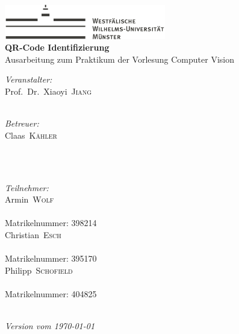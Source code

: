 
\begin{titlepage}
\begin{center}
\includegraphics[height=1.5cm, keepaspectratio]{images/Logo_WWU_Muenster.pdf} \\[1.0cm]
{\huge\sffamily\bfseries QR-Code Identifizierung}\\[0.5cm]
{\large Ausarbeitung zum Praktikum der Vorlesung  Computer Vision}\\[3.0cm]
\begin{minipage}[b]{0.7\textwidth}
	\begin{minipage}[t]{.5\textwidth}
		{\large \textit{Veranstalter:}}\\[5pt]
		{\Large Prof.\ Dr.\ Xiaoyi\ \textsc{Jiang}}\\[4pt]
		{}\\[1.0cm]
	\end{minipage}%
    \begin{minipage}[t]{.5\textwidth}
		{\large \textit{Betreuer:}}\\[5pt]
		{\Large Claas\ \textsc{Kähler}}\\[4pt]
		{}\\[0.5cm]
	\end{minipage}
\end{minipage}%
\\[2cm]
\begin{minipage}[b]{0.7\textwidth}
	{\large \textit{Teilnehmer:}}\\[5pt]
	{\Large Armin\ \textsc{Wolf}}\\[4pt]
    {}\\[4pt]
    {\large Matrikelnummer: 398214}\\[0.5cm]   
	{\Large Christian\ \textsc{Esch}}\\[4pt]
	{}\\[4pt]
	{\large Matrikelnummer: 395170}\\[0.5cm] 	 
	{\Large Philipp\ \textsc{Schofield}}\\[4pt]
	{}\\[4pt] 
	{\large Matrikelnummer: 404825}\\[0.5cm]
\end{minipage}
\\[2cm]
{\large\itshape Version vom \today}\\
\end{center}


\end{titlepage}
